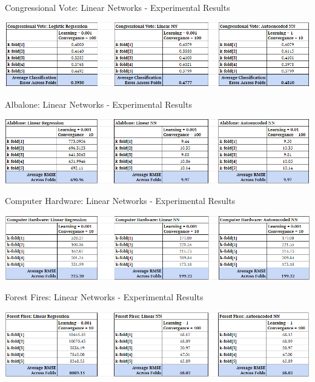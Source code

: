 \documentclass[twoside,11pt]{article}
\begin{document}
\begin{table}[h]
		\centering
		\caption{Congressional Vote: Linear Networks - Experimental Results}
		\label{tab:table3}
		\includegraphics[scale=.7]{CongVote_All_Results}\newline
\end{table}
\newpage
\begin{table}[h]
	\centering
	\caption{Albalone: Linear Networks - Experimental Results}
	\label{tab:table4}
	\includegraphics[scale=.7]{Albalone_All_Results}\newline
\end{table}

\begin{table}[h]
	\centering
	\caption{Computer Hardware: Linear Networks - Experimental Results}
	\label{tab:tale5}
	\includegraphics[scale=.7]{CompHW_All_Results}\newline
\end{table}

\begin{table}[h]
	\centering
	\caption{Forest Fires: Linear Networks - Experimental Results}
	\label{tab:table6}
	\includegraphics[scale=.7]{ForestFires_All_Results}\newline
\end{table}
\end{document}
